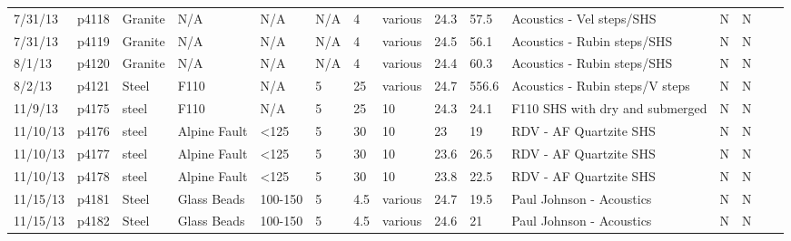 \begin{landscape}
\begin{longtable}{lllllllllllllll}
7/31/13  & p4118      & Granite          & N/A          & N/A          & N/A       & 4             & various                      & 24.3        & 57.5     & Acoustics - Vel steps/SHS                       & N     & N    &  &  \\
7/31/13  & p4119      & Granite          & N/A          & N/A          & N/A       & 4             & various                      & 24.5        & 56.1     & Acoustics - Rubin steps/SHS                     & N     & N    &  &  \\
8/1/13   & p4120      & Granite          & N/A          & N/A          & N/A       & 4             & various                      & 24.4        & 60.3     & Acoustics - Rubin steps/SHS                     & N     & N    &  &  \\
8/2/13   & p4121      & Steel            & F110         & N/A          & 5         & 25            & various                      & 24.7        & 556.6    & Acoustics - Rubin steps/V steps                 & N     & N    &  &  \\
11/9/13  & p4175      & steel            & F110         & N/A          & 5         & 25            & 10                           & 24.3        & 24.1     & F110 SHS with dry and submerged                 & N     & N    &  &  \\
11/10/13 & p4176      & steel            & Alpine Fault & \textless125 & 5         & 30            & 10                           & 23          & 19       & RDV - AF Quartzite SHS                          & N     & N    &  &  \\
11/10/13 & p4177      & steel            & Alpine Fault & \textless125 & 5         & 30            & 10                           & 23.6        & 26.5     & RDV - AF Quartzite SHS                          & N     & N    &  &  \\
11/10/13 & p4178      & steel            & Alpine Fault & \textless125 & 5         & 30            & 10                           & 23.8        & 22.5     & RDV - AF Quartzite SHS                          & N     & N    &  &  \\
11/15/13 & p4181      & Steel            & Glass Beads  & 100-150      & 5         & 4.5           & various                      & 24.7        & 19.5     & Paul Johnson - Acoustics                        & N     & N    &  &  \\
11/15/13 & p4182      & Steel            & Glass Beads  & 100-150      & 5         & 4.5           & various                      & 24.6        & 21       & Paul Johnson - Acoustics                        & N     & N    &  &  \\

\end{longtable}
\end{landscape}
